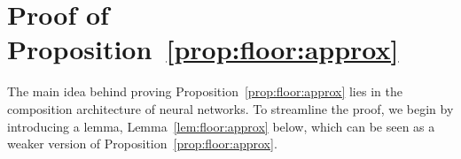 \documentclass[nohyperref]{article}
\theoremstyle{plain}
\theoremstyle{definition}
\theoremstyle{remark}
\begin{document}
%
%


	
	
\section{Proof of Proposition~\ref{prop:floor:approx}}
\label{sec:proof:prop:floor:approx}
	

 The main idea behind proving Proposition~\ref{prop:floor:approx} lies in the composition architecture of neural networks.	
 To streamline the proof, we begin by introducing a lemma, Lemma~\ref{lem:floor:approx} below, which can be seen as a weaker version of Proposition~\ref{prop:floor:approx}.
\end{document}
